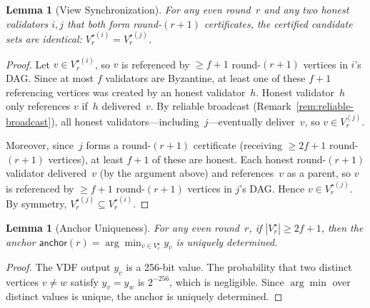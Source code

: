 \documentclass[11pt,a4paper]{article}
\newtheorem{lemma}[theorem]{Lemma}
\theoremstyle{definition}
\theoremstyle{remark}
\newcommand{\anchor}{\mathsf{anchor}}
\begin{document}
\begin{lemma}[View Synchronization]\label{lem:view-sync}
For any even round~$r$ and any two honest validators $i, j$ that both
form round-$(r\!+\!1)$ certificates, the certified candidate sets are identical:
$V_r^{\star(i)} = V_r^{\star(j)}$.
\end{lemma}

\begin{proof}
Let $v \in V_r^{\star(i)}$, so $v$ is referenced by $\geq f+1$
round-$(r\!+\!1)$ vertices in $i$'s DAG.
Since at most $f$ validators are Byzantine, at least one of these
$f+1$ referencing vertices was created by an honest validator~$h$.
Honest validator~$h$ only references $v$ if~$h$ delivered~$v$.
By reliable broadcast (Remark~\ref{rem:reliable-broadcast}), all honest
validators---including~$j$---eventually deliver~$v$, so
$v \in V_r^{(j)}$.

Moreover, since~$j$ forms a round-$(r\!+\!1)$ certificate (receiving
$\geq 2f+1$ round-$(r\!+\!1)$ vertices), at least $f+1$ of these are
honest.
Each honest round-$(r\!+\!1)$ validator delivered~$v$ (by the argument above)
and references~$v$ as a parent, so $v$ is referenced by $\geq f+1$
round-$(r\!+\!1)$ vertices in $j$'s DAG.
Hence $v \in V_r^{\star(j)}$.
By symmetry, $V_r^{\star(j)} \subseteq V_r^{\star(i)}$.
\end{proof}

\begin{lemma}[Anchor Uniqueness]\label{lem:anchor-unique-def}
For any even round~$r$, if $|V_r^{\star}| \geq 2f+1$, then the anchor
$\anchor(r) = \arg\min_{v \in V_r^{\star}} y_v$ is uniquely determined.
\end{lemma}

\begin{proof}
The VDF output $y_v$ is a 256-bit value.
The probability that two distinct vertices $v \neq w$ satisfy $y_v = y_w$
is $2^{-256}$, which is negligible.
Since $\arg\min$ over distinct values is unique, the anchor is uniquely
determined.
\end{proof}
\end{document}
